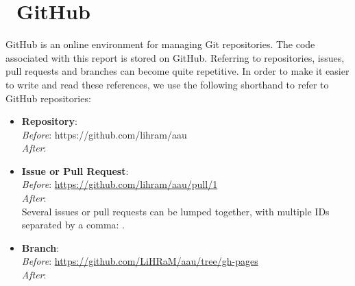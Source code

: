 \section*{\faGithub~GitHub}
GitHub is an online environment for managing Git repositories.
The code associated with this report is stored on GitHub.
Referring to repositories, issues, pull requests and branches can become quite repetitive.
In order to make it easier to write and read these references, we use the following shorthand to refer to GitHub repositories:
\begin{itemize}
	\item{
	      \textbf{Repository}: \\
	      \textit{Before}: https://github.com/lihram/aau\\
	      \textit{After}: 
	      }
	\item{
	      \textbf{Issue or Pull Request}: \\
	      \textit{Before}: \url{https://github.com/lihram/aau/pull/1}\\
	      \textit{After}: \\
	      Several issues or pull requests can be lumped together, with multiple IDs separated by a comma: .
	      }
	\item{
	      \textbf{Branch}: \\
	      \textit{Before}: \url{https://github.com/LiHRaM/aau/tree/gh-pages}\\
	      \textit{After}: 
	      }
\end{itemize}